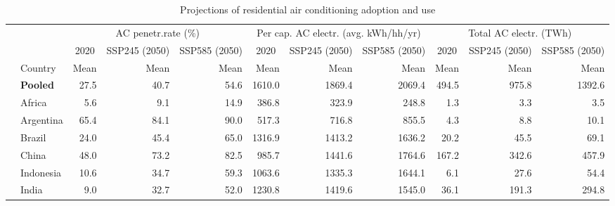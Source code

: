 \begin{table}
\small
 \caption{Projections of residential air conditioning adoption and use \label{tab:res_all}}\renewcommand*{\arraystretch}{1.1}
\centering
\begin{tabular}[t]{llrrrrrrrrr}
\toprule
\multicolumn{2}{c}{ } & \multicolumn{3}{c}{AC penetr.rate (\%)} & \multicolumn{3}{c}{Per cap. AC electr. (avg. kWh/hh/yr)} & \multicolumn{3}{c}{Total AC electr. (TWh)} \\
\cmidrule(l{3pt}r{3pt}){3-5} \cmidrule(l{3pt}r{3pt}){6-8} \cmidrule(l{3pt}r{3pt}){9-11}
\multicolumn{1}{c}{ } & \multicolumn{1}{c}{} & \multicolumn{1}{c}{2020} & \multicolumn{1}{c}{SSP245 (2050)} & \multicolumn{1}{c}{SSP585 (2050)} & \multicolumn{1}{c}{2020} & \multicolumn{1}{c}{SSP245 (2050)} & \multicolumn{1}{c}{SSP585 (2050)} & \multicolumn{1}{c}{2020} & \multicolumn{1}{c}{SSP245 (2050)} & \multicolumn{1}{c}{SSP585 (2050)} \\
\cmidrule(l{3pt}r{3pt}){2-2} \cmidrule(l{3pt}r{3pt}){3-3} \cmidrule(l{3pt}r{3pt}){4-4} \cmidrule(l{3pt}r{3pt}){5-5} \cmidrule(l{3pt}r{3pt}){6-6} \cmidrule(l{3pt}r{3pt}){7-7} \cmidrule(l{3pt}r{3pt}){8-8} \cmidrule(l{3pt}r{3pt}){9-9} \cmidrule(l{3pt}r{3pt}){10-10} \cmidrule(l{3pt}r{3pt}){11-11}
  & Country & Mean & Mean & Mean & Mean & Mean & Mean & Mean & Mean & Mean\\
\midrule\addlinespace
 & \textbf{Pooled} & \num{27.5} & \num{40.7} & \num{54.6} & \num{1610.0} & \num{1869.4} & \num{2069.4} & \num{494.5} & \num{975.8} & \num{1392.6}\\ \addlinespace\midrule\addlinespace
 & Africa & \num{5.6} & \num{9.1} & \num{14.9} & \num{386.8} & \num{323.9} & \num{248.8} & \num{1.3} & \num{3.3} & \num{3.5}\\ 
 & Argentina & \num{65.4} & \num{84.1} & \num{90.0} & \num{517.3} & \num{716.8} & \num{855.5} & \num{4.3} & \num{8.8} & \num{10.1}\\
 & Brazil & \num{24.0} & \num{45.4} & \num{65.0} & \num{1316.9} & \num{1413.2} & \num{1636.2} & \num{20.2} & \num{45.5} & \num{69.1}\\
 & China & \num{48.0} & \num{73.2} & \num{82.5} & \num{985.7} & \num{1441.6} & \num{1764.6} & \num{167.2} & \num{342.6} & \num{457.9}\\
 & Indonesia & \num{10.6} & \num{34.7} & \num{59.3} & \num{1063.6} & \num{1335.3} & \num{1644.1} & \num{6.1} & \num{27.6} & \num{54.4}\\
 & India & \num{9.0} & \num{32.7} & \num{52.0} & \num{1230.8} & \num{1419.6} & \num{1545.0} & \num{36.1} & \num{191.3} & \num{294.8}\\

\end{tabular}
\end{table}
